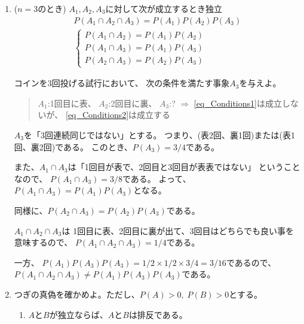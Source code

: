 \documentclass[12pt,b5paper]{ltjsarticle}
\begin{document}
\hrulefill

\begin{enumerate}
 \item
      ($n=3$のとき)
      $A_{1},A_{2},A_{3}$に対して次が成立するとき独立
      \begin{gather}
       P(A_{1} \cap A_{2} \cap A_{3}) = P(A_{1}) P(A_{2}) P(A_{3}) \label{eq_Conditions1} \\
       \begin{cases}
        P(A_{1} \cap A_{2}) = P(A_{1}) P(A_{2})\\
        P(A_{1} \cap A_{3}) = P(A_{1}) P(A_{3})\\
        P(A_{2} \cap A_{3}) = P(A_{2}) P(A_{3})
       \end{cases} \label{eq_Conditions2}
      \end{gather}

      コインを3回投げる試行において、
      次の条件を満たす事象$A_{3}$を与えよ。
      \begin{quotation}
       $A_{1}$:1回目に表、
       $A_{2}$:2回目に裏、
       $A_{3}$:?
       $\Longrightarrow$
       \eqref{eq_Conditions1}は成立しないが、
       \eqref{eq_Conditions2}は成立する
      \end{quotation}


      \dotfill

      $A_{3}$を「3回連続同じではない」とする。
      つまり、(表2回、裏1回)または(表1回、裏2回)である。
      このとき、$P(A_{3})=3/4$である。

      また、$A_{1}\cap A_{3}$は「1回目が表で、2回目と3回目が表表ではない」
      ということなので、
      $P(A_{1}\cap A_{3}) = 3/8$である。
      よって、$P(A_{1}\cap A_{3})=P(A_{1})P(A_{3})$となる。

      同様に、$P(A_{2}\cap A_{3})=P(A_{2})P(A_{3})$である。

      $A_{1}\cap A_{2}\cap A_{3}$は
      1回目に表、2回目に裏が出て、3回目はどちらでも良い事を意味するので、
      $P(A_{1}\cap A_{2}\cap A_{3})=1/4$である。

      一方、
      $P(A_{1})P(A_{3})P(A_{3})=1/2 \times 1/2 \times 3/4 = 3/16$であるので、
      $P(A_{1}\cap A_{2}\cap A_{3}) \ne P(A_{1})P(A_{3})P(A_{3})$である。

      \hrulefill


 \item
      つぎの真偽を確かめよ。ただし、$P(A)>0, \; P(B)>0$とする。
      \begin{enumerate}
        \item $A$と$B$が独立ならば、$A$と$B$は排反である。


\end{enumerate}
\end{enumerate}
\end{document}
